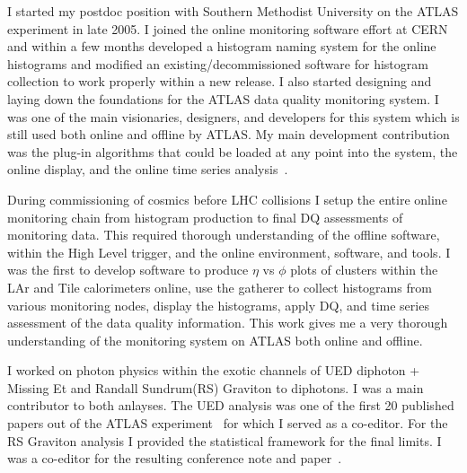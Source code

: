 I started my postdoc position with Southern Methodist University on the ATLAS experiment in late 2005.  I joined the online monitoring software effort at CERN and within a few months developed a histogram
naming system for the online histograms and modified an existing/decommissioned software for histogram collection to work properly within a new release.  
I also started designing and laying down the foundations for the ATLAS data quality monitoring system.  I was one of the main visionaries, designers, and developers for this system
which is still used both online and offline by ATLAS. My main development contribution was the plug-in algorithms that could be loaded at any point into the system, the online display, and the online time series analysis~\cite{atl5b,atl6}.

During commissioning of cosmics before LHC collisions I setup the entire online monitoring chain from histogram production to final DQ assessments of monitoring data.  This required thorough understanding
of the offline software, within the High Level trigger, and the online environment, software, and tools.  I was the first to develop software to produce $\eta$ vs $\phi$ plots of clusters within the LAr and Tile calorimeters online, use the gatherer to
collect histograms from various monitoring nodes, display the histograms, apply DQ, and time series assessment of the data quality information.  This work gives me a very thorough understanding of the monitoring system on ATLAS both online and offline.

I worked on photon physics within the exotic channels of UED diphoton + Missing Et and Randall Sundrum(RS) Graviton to diphotons. I was a main contributor to both anlayses.  The UED analysis was one of the first 20 published papers
out of the ATLAS experiment~\cite{atl2} for which I served as a co-editor. For the RS Graviton analysis I provided the statistical framework for the final limits. I was a co-editor for the resulting conference note and paper~\cite{atl1,atl1-conf}.

